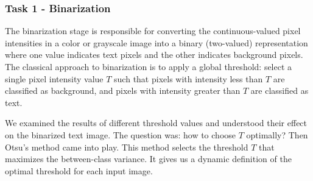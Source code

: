 \subsubsection{Task 1 - Binarization}
The binarization stage is responsible for converting the continuous-valued pixel intensities in a color or grayscale image into a binary (two-valued) representation where one value indicates text pixels and the other indicates background pixels. 
The classical approach to binarization is to apply a global threshold: select a single pixel intensity value \(T\) such that pixels with intensity less than \(T\) are classified as background, and pixels with intensity greater than \(T\) are classified as text. 

\indent We examined the results of different threshold values and understood their effect on the binarized text image. The question was: how to choose \(T\) optimally? Then Otsu's method came into play. This method selects the threshold \(T\) that maximizes the between-class variance. It gives us a dynamic definition of the optimal threshold for each input image.
